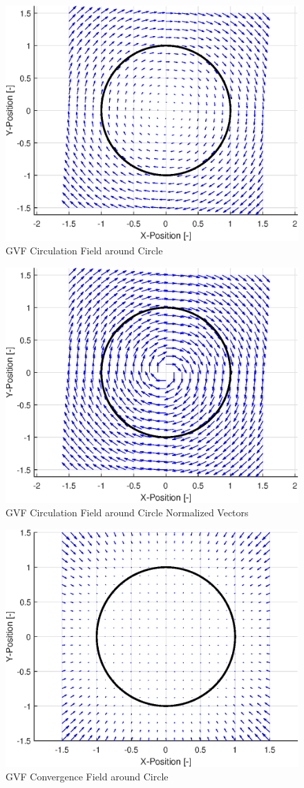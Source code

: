 \documentclass[conf]{new-aiaa}
\begin{document}
\begin{figure}[H]
	\centering
	\includegraphics[width=0.7\linewidth]{Circ}
	\caption{GVF Circulation Field around Circle}
	\label{fig:circ}
\end{figure}
\begin{figure}[H]
	\centering
	\includegraphics[width=0.7\linewidth]{Circnorm}
	\caption{GVF Circulation Field around Circle Normalized Vectors}
	\label{fig:circn}
\end{figure}
\begin{figure}[H]
	\centering
	\includegraphics[width=0.7\linewidth]{Conv}
	\caption{GVF Convergence Field around Circle}
	\label{fig:Conv}
\end{figure}
\end{document}
